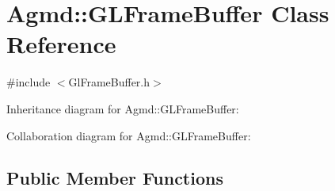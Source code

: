 \hypertarget{class_agmd_1_1_g_l_frame_buffer}{\section{Agmd\+:\+:G\+L\+Frame\+Buffer Class Reference}
\label{class_agmd_1_1_g_l_frame_buffer}
}


{\ttfamily \#include $<$Gl\+Frame\+Buffer.\+h$>$}



Inheritance diagram for Agmd\+:\+:G\+L\+Frame\+Buffer\+:


Collaboration diagram for Agmd\+:\+:G\+L\+Frame\+Buffer\+:
\subsection*{Public Member Functions}
